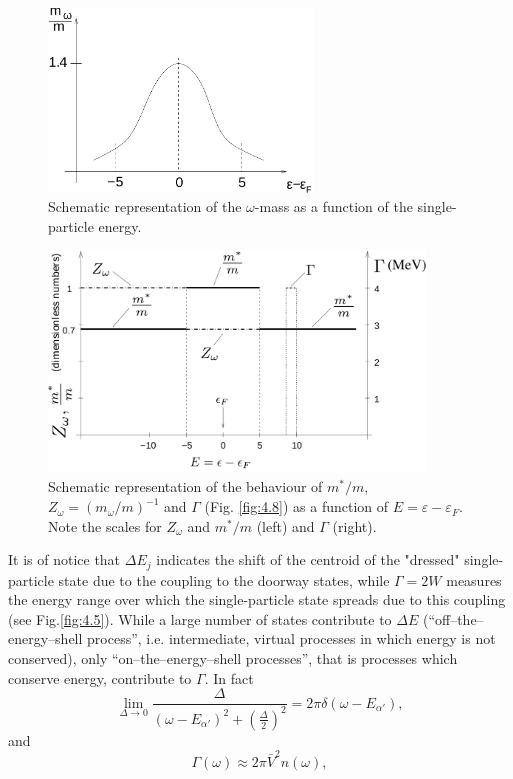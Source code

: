 \begin{figure}[h!]
\centerline {
\includegraphics*[width=7cm]{introduccion/figs/figintroD3}
}
\caption{Schematic representation of the $\omega$-mass as a function of the single-particle energy.}
\label{fig:4.3}
\end{figure}

\begin{figure}[h!]
\centerline {
\includegraphics*[width=10cm]{introduccion/figs/figintroD4}
}
\caption{Schematic representation of the behaviour of $m^*/m$, $Z_{\omega}=(m_{\omega}/m)^{-1}$ and $\Gamma$ (Fig. \ref{fig:4.8}) as a function of $E = \varepsilon - \varepsilon_F$. Note the scales for $Z_\omega$ and $m^*/m$ (left) and $\Gamma$ (right).}
\label{fig:4.4}
\end{figure}


It is of notice that $\Delta E_j$ indicates the shift  of the  centroid of the "dressed" single-particle state due to the coupling to the  doorway states, while $\Gamma = 2W$ measures the energy range over which the single-particle state spreads due to this coupling (see Fig.\ref{fig:4.5}). While a large number of states contribute to $\Delta E$ (``off--the--energy--shell process'', i.e. intermediate, virtual processes in which energy is not conserved), only ``on--the--energy--shell processes'', that is processes which conserve  energy, contribute to $\Gamma$. In fact
\begin{equation}
\nonumber
\lim_{\Delta \rightarrow 0} \frac{\Delta}{(\omega -E_{\alpha'})^2 + \left( \frac{\Delta}{2} \right)^2} = 2\pi\delta(\omega-E_{\alpha'}) ,
\end{equation}
and
\begin{equation}
\Gamma(\omega) \approx 2\pi \bar{V}^2 n(\omega) ,
\label{eqn:41}
\end{equation}

